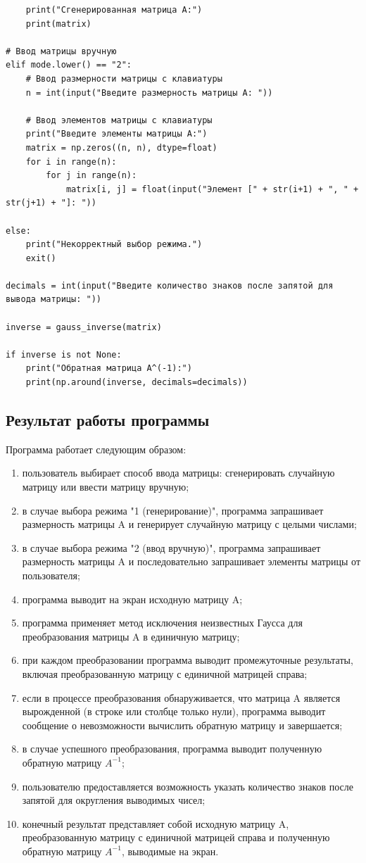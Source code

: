 \documentclass[12pt,a4paper]{scrartcl}
\begin{document}
\begin{verbatim}
    print("Сгенерированная матрица A:")
    print(matrix)

# Ввод матрицы вручную
elif mode.lower() == "2":
    # Ввод размерности матрицы с клавиатуры
    n = int(input("Введите размерность матрицы A: "))
    
    # Ввод элементов матрицы с клавиатуры
    print("Введите элементы матрицы A:")
    matrix = np.zeros((n, n), dtype=float)
    for i in range(n):
        for j in range(n):
            matrix[i, j] = float(input("Элемент [" + str(i+1) + ", " + str(j+1) + "]: "))
    
else:
    print("Некорректный выбор режима.")
    exit()

decimals = int(input("Введите количество знаков после запятой для вывода матрицы: "))

inverse = gauss_inverse(matrix)

if inverse is not None:
    print("Обратная матрица A^(-1):")
    print(np.around(inverse, decimals=decimals))
\end{verbatim}

\subsection{Результат работы программы}
Программа работает следующим образом:

\begin{enumerate}
    \item пользователь выбирает способ ввода матрицы: сгенерировать случайную матрицу или ввести матрицу вручную;
    \item в случае выбора режима "1 (генерирование)", программа запрашивает размерность матрицы A и генерирует случайную матрицу с целыми числами;
    \item в случае выбора режима "2 (ввод вручную)", программа запрашивает размерность матрицы A и последовательно запрашивает элементы матрицы от пользователя;
    \item программа выводит на экран исходную матрицу A;
    \item программа применяет метод исключения неизвестных Гаусса для преобразования матрицы A в единичную матрицу;
    \item при каждом преобразовании программа выводит промежуточные результаты, включая преобразованную матрицу с единичной матрицей справа;
    \item если в процессе преобразования обнаруживается, что матрица A является вырожденной (в строке или столбце только нули), программа выводит сообщение о невозможности вычислить обратную матрицу и завершается;
    \item в случае успешного преобразования, программа выводит полученную обратную матрицу $A^{-1}$;
    \item пользователю предоставляется возможность указать количество знаков после запятой для округления выводимых чисел;
    \item конечный результат представляет собой исходную матрицу A, преобразованную матрицу с единичной матрицей справа и полученную обратную матрицу $A^{-1}$, выводимые на экран.
    \end{enumerate}
    \noindent
\end{document}
